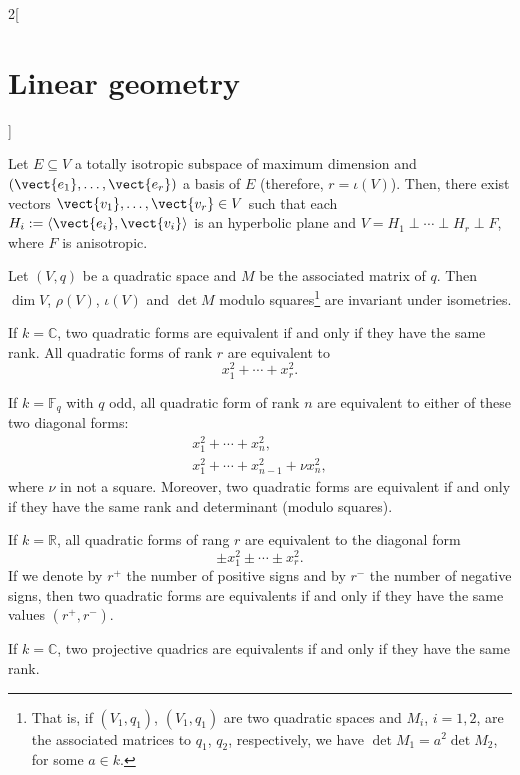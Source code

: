 \documentclass[../../../main.tex]{subfiles}
\begin{document}
\begin{multicols}{2}[\section{Linear geometry}]
\begin{theorem}
Let $E\subseteq V$ a totally isotropic subspace of maximum dimension and $(\vect{e_1},\ldots,\vect{e_r})$ a basis of $E$ (therefore, $r=\iota(V)$). Then, there exist vectors $\vect{v_1},\ldots,\vect{v_r}\in V$ such that each $H_i:=\langle\vect{e_i},\vect{v_i}\rangle$ is an hyperbolic plane and $V=H_1\perp\cdots\perp H_r\perp F$, where $F$ is anisotropic.
\end{theorem}
\begin{prop}
Let $(V,q)$ be a quadratic space and $M$ be the associated matrix of $q$. Then $\dim V$, $\rho(V)$, $\iota (V)$ and $\det M$ modulo squares\footnote{That is, if $(V_1,q_1)$, $(V_1,q_1)$ are two quadratic spaces and $M_i$, $i=1,2$, are the associated matrices to $q_1$, $q_2$, respectively, we have $\det M_1=a^2\det M_2$, for some $a\in k$.} are invariant under isometries. 
\end{prop}
\begin{theorem}
If $k=\mathbb{C}$, two quadratic forms are equivalent if and only if they have the same rank. All quadratic forms of rank $r$ are equivalent to $$x_1^2+\cdots+x_r^2.$$
\end{theorem}
\begin{theorem}
If $k=\mathbb{F}_q$ with $q$ odd, all quadratic form
of rank $n$ are equivalent to either of these two diagonal forms: 
\begin{gather*}
    x_1^2+\cdots+ x_n^2,\\
    x_1^2+\cdots+ x_{n-1}^2+\nu x_n^2,
\end{gather*}
where $\nu$ in not a square. Moreover, two quadratic forms are equivalent if and only if they have the same rank and determinant (modulo squares).
\end{theorem}
\begin{theorem}
If $k=\mathbb{R}$, all quadratic forms
of rang $r$ are equivalent to the diagonal form 
$$\pm x_1^2\pm\cdots\pm x_r^2.$$ If we denote by $r^+$ the number of positive signs and by $r^-$ the number of negative signs, then two quadratic forms are equivalents if and only if they have the same values $(r^+,r^-)$.
\end{theorem}
\begin{theorem}
If $k=\mathbb{C}$, two projective quadrics are equivalents if and only if they have the same rank.
\end{theorem}

\end{multicols}
\end{document}

